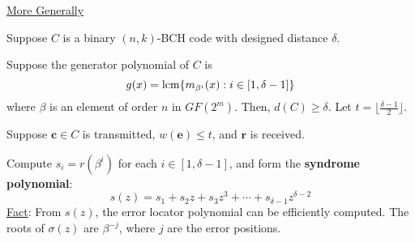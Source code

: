\underline{More Generally}

Suppose $ C $ is a binary $ (n,k) $-BCH code with designed distance $ \delta $.

Suppose the generator polynomial of $ C $ is
\[ g(x)=\operatorname{lcm} \{m_{\beta^i}(x):i\in[1,\delta-1]\} \]
where $ \beta $ is an element of order $ n $ in $ GF(2^m) $. Then, $ d(C)\geqslant \delta $.
Let $ t=\lfloor \frac{\delta-1}{2} \rfloor $.

Suppose $ \bm{c}\in C $ is transmitted, $ w(\bm{e})\leqslant t $, and $ \bm{r} $
is received.

Compute $ s_i=r(\beta^i) $ for each $ i\in[1,\delta-1] $, and form the
\textbf{syndrome polynomial}:
\[ s(z)=s_1+s_2z+s_3z^3+\cdots+s_{\delta-1}z^{\delta-2} \]
\underline{Fact}: From $ s(z) $, the error locator polynomial
can be efficiently computed. The roots of $ \sigma(z) $
are $ \beta^{-j} $, where $ j $ are the error positions.
